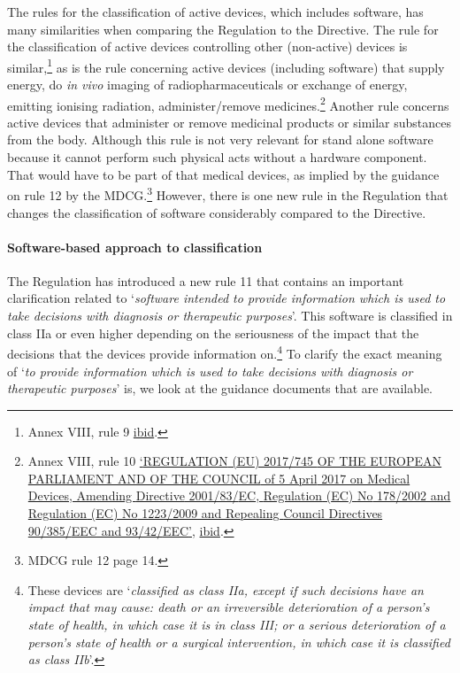 \documentclass[
]{scrartcl}
\begin{document}
The rules for the classification of active devices, which includes software, has many similarities when comparing the Regulation to the Directive. The rule for the classification of active devices controlling other (non-active) devices is similar,\footnote{Annex VIII, rule 9 \protect\hyperlink{ref-REGULATIONEU2017a}{ibid}.} as is the rule concerning active devices (including software) that supply energy, do \emph{in vivo} imaging of radiopharmaceuticals or exchange of energy, emitting ionising radiation, administer/remove medicines.\footnote{Annex VIII, rule 10 \protect\hyperlink{ref-REGULATIONEU2017a}{{`{REGULATION} ({EU}) 2017/745 {OF THE EUROPEAN PARLIAMENT AND OF THE COUNCIL} of 5 {April} 2017 on Medical Devices, Amending {Directive} 2001/83/{EC}, {Regulation} ({EC}) {No} 178/2002 and {Regulation} ({EC}) {No} 1223/2009 and Repealing {Council Directives} 90/385/{EEC} and 93/42/{EEC}'}}, \protect\hyperlink{ref-REGULATIONEU2017a}{ibid}.} Another rule concerns active devices that administer or remove medicinal products or similar substances from the body. Although this rule is not very relevant for stand alone software because it cannot perform such physical acts without a hardware component. That would have to be part of that medical devices, as implied by the guidance on rule 12 by the MDCG.\footnote{MDCG rule 12 page 14.} However, there is one new rule in the Regulation that changes the classification of software considerably compared to the Directive.

\hypertarget{software-based-approach-to-classification}{%
\paragraph{Software-based approach to classification}\label{software-based-approach-to-classification}}

The Regulation has introduced a new rule 11 that contains an important clarification related to `\emph{software intended to provide information which is used to take decisions with diagnosis or therapeutic purposes}'. This software is classified in class IIa or even higher depending on the seriousness of the impact that the decisions that the devices provide information on.\footnote{These devices are `\emph{classified as class IIa, except if such decisions have an impact that may cause: death or an irreversible deterioration of a person's state of health, in which case it is in class III; or a serious deterioration of a person's state of health or a surgical intervention, in which case it is classified as class IIb}'.\footnotemark{}} To clarify the exact meaning of `\emph{to provide information which is used to take decisions with diagnosis or therapeutic purposes}' is, we look at the guidance documents that are available.
\end{document}

